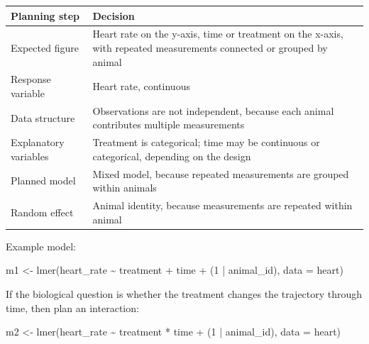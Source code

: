 \documentclass[
  letterpaper,
  8pt,
  a4paper]{book}
\newenvironment{Shaded}{\begin{snugshade}}{\end{snugshade}}
\newcommand{\AttributeTok}[1]{\textcolor[rgb]{0.40,0.45,0.13}{#1}}
\newcommand{\DecValTok}[1]{\textcolor[rgb]{0.68,0.00,0.00}{#1}}
\newcommand{\FunctionTok}[1]{\textcolor[rgb]{0.28,0.35,0.67}{#1}}
\newcommand{\NormalTok}[1]{\textcolor[rgb]{0.00,0.23,0.31}{#1}}
\newcommand{\OtherTok}[1]{\textcolor[rgb]{0.00,0.23,0.31}{#1}}
\newcommand{\SpecialCharTok}[1]{\textcolor[rgb]{0.37,0.37,0.37}{#1}}
\newcounter{none} %
\begin{document}
{\def\LTcaptype{none} %
\begin{longtable}[]{@{}
  >{\raggedright\arraybackslash}p{}
  >{\raggedright\arraybackslash}p{}@{}}
\toprule\noalign{}
\begin{minipage}[b]{\linewidth}\raggedright
Planning step
\end{minipage} & \begin{minipage}[b]{\linewidth}\raggedright
Decision
\end{minipage} \\
\midrule\noalign{}
\endhead
\bottomrule\noalign{}
\endlastfoot
Expected figure & Heart rate on the y-axis, time or treatment on the
x-axis, with repeated measurements connected or grouped by animal \\
Response variable & Heart rate, continuous \\
Data structure & Observations are not independent, because each animal
contributes multiple measurements \\
Explanatory variables & Treatment is categorical; time may be continuous
or categorical, depending on the design \\
Planned model & Mixed model, because repeated measurements are grouped
within animals \\
Random effect & Animal identity, because measurements are repeated
within animal \\
\end{longtable}
}

Example model:

\begin{Shaded}
\begin{Highlighting}[]
\NormalTok{m1 }\OtherTok{\textless{}{-}} \FunctionTok{lmer}\NormalTok{(heart\_rate }\SpecialCharTok{\textasciitilde{}}\NormalTok{ treatment }\SpecialCharTok{+}\NormalTok{ time }\SpecialCharTok{+}\NormalTok{ (}\DecValTok{1} \SpecialCharTok{|}\NormalTok{ animal\_id), }\AttributeTok{data =}\NormalTok{ heart)}
\end{Highlighting}
\end{Shaded}

If the biological question is whether the treatment changes the
trajectory through time, then plan an interaction:

\begin{Shaded}
\begin{Highlighting}[]
\NormalTok{m2 }\OtherTok{\textless{}{-}} \FunctionTok{lmer}\NormalTok{(heart\_rate }\SpecialCharTok{\textasciitilde{}}\NormalTok{ treatment }\SpecialCharTok{*}\NormalTok{ time }\SpecialCharTok{+}\NormalTok{ (}\DecValTok{1} \SpecialCharTok{|}\NormalTok{ animal\_id), }\AttributeTok{data =}\NormalTok{ heart)}
\end{Highlighting}
\end{Shaded}
\end{document}
